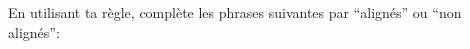 \documentclass[a4paper,11pt]{report}
\begin{document}
\begin{exop}
{En utilisant ta règle, complète les phrases suivantes par ``alignés'' ou ``non alignés'':

}
\end{exop}
\end{document}
